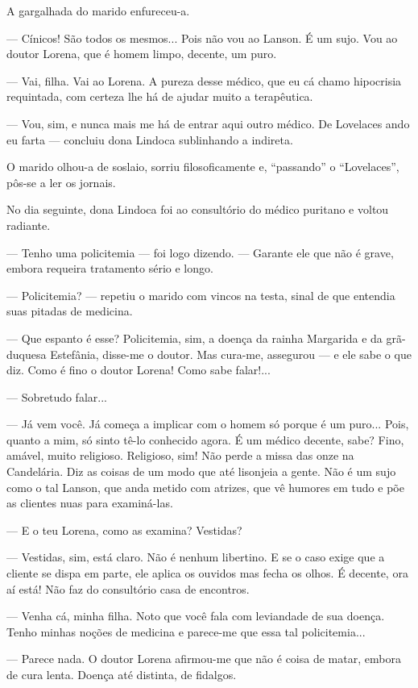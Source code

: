 A gargalhada do marido enfureceu-a.

--- Cínicos! São todos os mesmos... Pois não vou ao Lanson. É um sujo.
Vou ao doutor Lorena, que é homem limpo, decente, um puro.

--- Vai, filha. Vai ao Lorena. A pureza desse médico, que eu cá chamo
hipocrisia requintada, com certeza lhe há de ajudar muito a terapêutica.

--- Vou, sim, e nunca mais me há de entrar aqui outro médico. De
Lovelaces ando eu farta --- concluiu dona Lindoca sublinhando a
indireta.

O marido olhou-a de soslaio, sorriu filosoficamente e, ``passando'' o
``Lovelaces'', pôs-se a ler os jornais.

No dia seguinte, dona Lindoca foi ao consultório do médico puritano e
voltou radiante.

--- Tenho uma policitemia --- foi logo dizendo. --- Garante ele que não
é grave, embora requeira tratamento sério e longo.

--- Policitemia? --- repetiu o marido com vincos na testa, sinal de que
entendia suas pitadas de medicina.

--- Que espanto é esse? Policitemia, sim, a doença da rainha Margarida e
da grã-duquesa Estefânia, disse-me o doutor. Mas cura-me, assegurou ---
e ele sabe o que diz. Como é fino o doutor Lorena! Como sabe falar!...

--- Sobretudo falar...

--- Já vem você. Já começa a implicar com o homem só porque é um puro...
Pois, quanto a mim, só sinto tê-lo conhecido agora. É um médico decente,
sabe? Fino, amável, muito religioso. Religioso, sim! Não perde a missa
das onze na Candelária. Diz as coisas de um modo que até lisonjeia a
gente. Não é um sujo como o tal Lanson, que anda metido com atrizes, que
vê humores em tudo e põe as clientes nuas para examiná-las.

--- E o teu Lorena, como as examina? Vestidas?

--- Vestidas, sim, está claro. Não é nenhum libertino. E se o caso exige
que a cliente se dispa em parte, ele aplica os ouvidos mas fecha os
olhos. É decente, ora aí está! Não faz do consultório casa de encontros.

--- Venha cá, minha filha. Noto que você fala com leviandade de sua
doença. Tenho minhas noções de medicina e parece-me que essa tal
policitemia...

--- Parece nada. O doutor Lorena afirmou-me que não é coisa de matar,
embora de cura lenta. Doença até distinta, de fidalgos.

